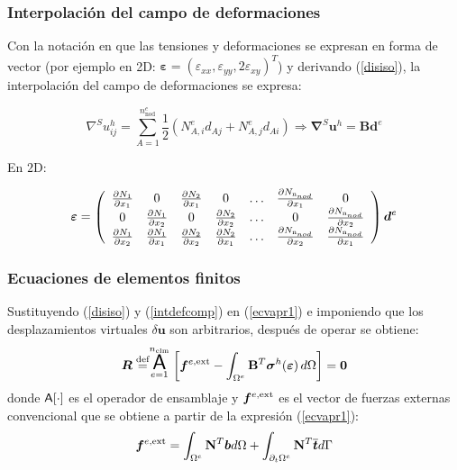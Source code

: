 \documentclass[handout]{beamer}
\begin{document}
\begin{frame}
\frametitle{Interpolación del campo de deformaciones}

Con la notación en que las tensiones y
deformaciones se expresan en forma de vector (por ejemplo en 2D:
$\bm{\varepsilon}=(\varepsilon_{xx},\varepsilon_{yy},2
\varepsilon_{xy})^T$) y derivando (\ref{disiso}), la interpolación del campo
de deformaciones se expresa:
\begin{small}
\begin{equation}
\nabla^S u^h_{ij}=\sum_{A=1}^{n^e_{\textrm{nod}}}
\frac{1}{2}\left(N^e_{A,i} d_{Aj}+N^e_{A,j} d_{Ai}
\right) \Rightarrow
\bm{\nabla}^{S}\bm{u}^h=\mathbf{B} \bm{d}^e \label{intdefcomp}
\end{equation}
\end{small}
En $2$D:
\begin{small}
\begin{equation}
\bm{\varepsilon}=
\left(
\begin{array}{ccccccc}
\frac{\partial N_1}{\partial x_1} & 0 &\frac{\partial N_2}{\partial x_1} &0 &
\ldots & \frac{\partial N_{\textrm n_{nod}}}{\partial x_1} & 0 \\
0 & \frac{\partial N_1}{\partial x_2} & 0 &\frac{\partial N_2}{\partial x_2} &
\ldots & 0 & \frac{\partial N_{\textrm n_{nod}}}{\partial x_2} \\
\frac{\partial N_1}{\partial x_2} &\frac{\partial N_1}{\partial x_1} &
\frac{\partial N_2}{\partial x_2} &\frac{\partial N_2}{\partial x_1} &
\ldots & \frac{\partial N_{\textrm n_{nod}}}{\partial x_2} &\frac{\partial
N_{\textrm n_{nod}}}{\partial x_1}
\end{array}
\right)\bm{d}^e
\end{equation}
\end{small}
\end{frame}
\begin{frame}
\frametitle{Ecuaciones de elementos finitos}
Sustituyendo (\ref{disiso}) y (\ref{intdefcomp}) en (\ref{ecvapr1})
e imponiendo que los desplazamientos virtuales $\delta \bm{u}$ son arbitrarios,
después de operar se obtiene:
\begin{equation}
\bm{R}\stackrel{\textrm{def}}{=}\stackrel{n_{\textrm{elm}}}{
\underset{e=1}{\mbox{\LARGE{\bf {\sf A}}}}} \left[
\bm{f}^{e,{\rm ext}}-\int_{\Omega^e}
\mathbf{B}^{T} \bm{\sigma}^{h}(\bm{\varepsilon})
\,d\Omega \right] = \bm{0} \label{resmef1}
\end{equation}
donde ${\Large \bf{\sf A}[\cdot]}$ es el operador de ensamblaje y
$\bm{f}^{e,{\rm ext}}$
es el vector de fuerzas externas convencional que se obtiene a partir de la
expresión (\ref{ecvapr1}):
\begin{equation}
\bm{f}^{e,{\rm ext}}=\int_{\Omega^e} \mathbf{N}^{T} \bm{b} d\Omega+
\int_{\partial_t \Omega^e} \mathbf{N}^{T} \overline{\bm{t}} d \Gamma
\label{fexter}
\end{equation}
\end{frame}
\end{document}

